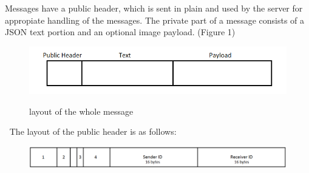 \documentclass{report}
\newcommand{\lfig}[1]{\label{fig:#1}}
\begin{document}
Messages have a public header, which is sent in plain and used by the server for appropiate handling of the messages. The private part of a message consists of a JSON text portion and an optional image payload. (Figure 1)

\begin{figure}[H]

	\setcounter{figure}{0}
	\centering
    \includegraphics[width=\columnwidth]{Layout.png}
    \lfig{Layout}
    \vspace{-7mm} %
    \label{Figure 1}
    \caption{layout of the whole message}
\end{figure}
\vspace{-3mm}
$\:$\newline
The layout of the public header is as follows:


\begin{figure}[H]

	\centering
    \includegraphics[width =\columnwidth]{PublicHeader.png}
    \lfig{PublicHeader}
    \vspace{-5mm} %
\end{figure}
\end{document}
